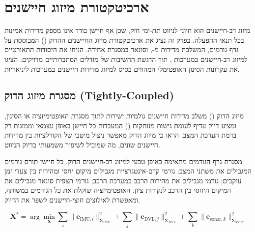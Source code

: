 
\section{ארכיטקטורת מיזוג חיישנים}
\label{sec:sensor_fusion}

מיזוג רב-חיישנים הוא חיוני לניווט תת-ימי חזק, שכן אף חיישן בודד אינו מספק מדידות אמינות בכל תנאי ההפעלה. בפרק זה נציג את ארכיטקטורת מיזוג החיישנים ההדוק () המבוססת על גרף גורמים, המשלבת מדידות מ-,  וסונאר במסגרת אחידה. \citet{Thrun2005ProbRobotics} הניחו את היסודות התאורטיים למיזוג רב-חיישנים במערכות , תוך הדגשת החשיבות של מודלים הסתברותיים מדויקים. \citet{Kalman1960} הציגו את עקרונות הסינון האופטימלי המהווים בסיס למיזוג מדידות חיישנים במערכות ליניאריות.

\subsection{מסגרת מיזוג הדוק (Tightly-Coupled)}
\label{sec:tightly_coupled}

מיזוג הדוק () משלב מדידות חיישנים גולמיות ישירות לתוך מסגרת האופטימיזציה או הסינון, ומציע דיוק עדיף לעומת גישות מנותקות () המעבדות כל חיישן באופן עצמאי וממזגות רק ברמת הערכת המצב. \citet{Grisetti2010g2o} הראו כי מיזוג הדוק מאפשר ניצול מיטבי של הקורלציות בין מדידות חיישנים שונים, מה שמוביל לשיפור משמעותי בדיוק הניווט.

מסגרת גרף הגורמים מתאימה באופן טבעי למיזוג רב-חיישנים הדוק. כל חיישן תורם גורמים המגבילים את משתני המצב: גורמי קדם-אינטגרציית  מגבילים מיקום יחסי ומהירות בין צעדי זמן עוקבים; גורמי  מגבילים את מהירות הרכב במערכת הרכב; גורמי תצפית סונאר מגבילים את המיקום היחסי בין הרכב לנקודות ציון. האופטימיזציה שוקלת את כל הגורמים במשותף, ומאפשרת לאילוצים חוצי-חיישנים לשפר את הדיוק.

\begin{equation}
\mathbf{X}^* = \arg\min_{\mathbf{X}} \sum_{i} \| \mathbf{e}_{\text{IMU}, i} \|_{\boldsymbol{\Sigma}_{\text{IMU}}}^2 + \sum_{j} \| \mathbf{e}_{\text{DVL}, j} \|_{\boldsymbol{\Sigma}_{\text{DVL}}}^2 + \sum_{k} \| \mathbf{e}_{\text{sonar}, k} \|_{\boldsymbol{\Sigma}_{\text{sonar}}}^2
\label{eq:multi_sensor_optimization_fusion}
\end{equation}

